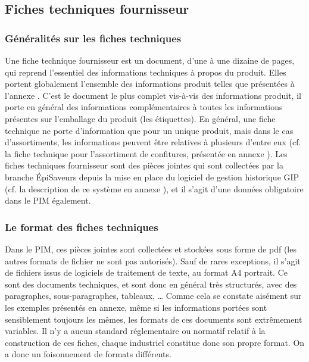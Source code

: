             \subsection{Fiches techniques fournisseur}
            \label{fiches_techniques}

                \subsubsection{Généralités sur les fiches techniques}
            Une fiche technique fournisseur est un document, d'une à une dizaine de pages, qui reprend l'essentiel des informations techniques à propos du produit.
            Elles portent globalement l'ensemble des informations produit telles que présentées à l'annexe .
            C'est le document le plus complet vis-à-vis des informations produit, il porte en général des informations complémentaires à toutes les informations présentes sur l'emballage du produit (les étiquettes).
            En général, une fiche technique ne porte d'information que pour un unique produit, mais dans le cas d'assortiments, les informations peuvent être relatives à plusieurs d'entre eux (cf. la fiche technique pour l'assortiment de confitures, présentée en annexe ).
            Les fiches techniques fournisseur sont des pièces jointes qui sont collectées par la branche \'{E}piSaveurs depuis la mise en place du logiciel de gestion historique GIP (cf. la description de ce système en annexe ), et il s'agit d'une données obligatoire dans le PIM également.
            
                \subsubsection{Le format des fiches techniques}
            Dans le PIM, ces pièces jointes sont collectées et stockées sous forme de pdf (les autres formats de fichier ne sont pas autorisés).
            Sauf de rares exceptions, il s'agit de fichiers issus de logiciels de traitement de texte, au format A4 portrait.
            Ce sont des documents techniques, et sont donc en général très structurés, avec des paragraphes, sous-paragraphes, tableaux, \dots
            Comme cela se constate aisément sur les exemples présentés en annexe, même si les informations portées sont sensiblement toujours les mêmes, les formats de ces documents sont extrêmement variables.
            Il n'y a aucun standard réglementaire ou normatif relatif à la construction de ces fiches, chaque industriel constitue donc son propre format.
            On a donc un foisonnement de formats différents.

